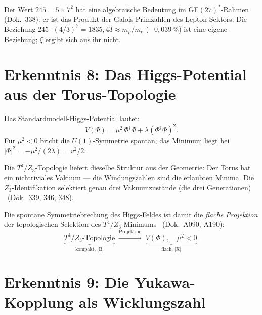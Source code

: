 Der Wert $245 = 5 \times 7^2$ hat eine algebraische Bedeutung im GF$(27)^*$-Rahmen
(Dok.~338): er ist das Produkt der Galois-Primzahlen des Lepton-Sektors.
Die Beziehung $245\cdot(4/3)^7 = 1835{,}43 \approx m_p/m_e$ ($-0{,}039\,\%$) ist eine
eigene Beziehung; $\xi$ ergibt sich aus ihr nicht.

\section{Erkenntnis 8: Das Higgs-Potential aus der Torus-Topologie}

Das Standardmodell-Higgs-Potential lautet:
\begin{equation}
  V(\Phi) = \mu^2\,\Phi^\dagger\Phi + \lambda(\Phi^\dagger\Phi)^2.
  \label{eq:higgs_potential}
\end{equation}
Für $\mu^2 < 0$ bricht die $U(1)$-Symmetrie spontan; das Minimum liegt bei
$|\Phi|^2 = -\mu^2/(2\lambda) = v^2/2$.

Die $T^4/Z_3$-Topologie liefert dieselbe Struktur aus der Geometrie:
Der Torus hat ein nichtriviales Vakuum --- die Windungszahlen sind die
erlaubten Minima. Die $Z_3$-Identifikation selektiert genau drei
Vakuumzustände (die drei Generationen) \BM\ (Dok.~339, 346, 348).

Die spontane Symmetriebrechung des Higgs-Feldes ist damit die \emph{flache
Projektion} der topologischen Selektion des $T^4/Z_3$-Minimums \BM\
(Dok.~A090, A190):
\begin{equation}
  \underbrace{T^4/Z_3\text{-Topologie}}_{\text{kompakt, [B]}}
  \;\xrightarrow{\text{Projektion}}\;
  \underbrace{V(\Phi),\quad\mu^2 < 0}_{\text{flach, [X]}}.
  \label{eq:projection}
\end{equation}

\section{Erkenntnis 9: Die Yukawa-Kopplung als Wicklungszahl}

